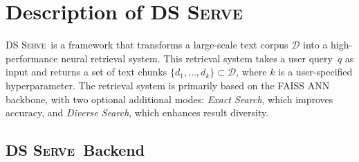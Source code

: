 \documentclass[letterpaper]{article} %
\newcommand{\sys}{\textsc{DS Serve\xspace}}%
\newcommand{\sewon}[1]{{\color{purple!70}[sewon: #1]}}
\newcommand{\yichuan}[1]{{\color{blue}[yichuan: #1]}}
\newcommand{\jinjian}[1]{{\color{teal}[jinjian: #1]}}
\newcommand{\sewon}[1]{}
\newcommand{\yichuan}[1]{}
\newcommand{\jinjian}[1]{}
\begin{document}
\section{Description of \sys}
\sys\ is a framework that transforms a large-scale text corpus $\mathcal{D}$ into a high-performance neural retrieval system. %
This retrieval system takes a user query~$q$ as input and returns a set of text chunks $\{d_1, \ldots, d_k\} \subset \mathcal{D}$, 
where $k$ is a user-specified hyperparameter. %
The retrieval system is primarily based on the FAISS ANN backbone, with two optional additional modes:
\emph{Exact Search}, which improves accuracy, and \emph{Diverse Search}, which enhances result diversity.


\subsection{\sys\ Backend}
\end{document}
